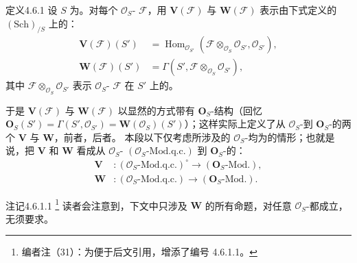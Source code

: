 \begin{SGAresult}{定义}{4.6.1}
设 $S$ 为。对每个 $\mathcal O_S$- $\mathcal F$，用 $\mathbf V(\mathcal F)$ 与 $\mathbf W(\mathcal F)$ 表示由下式定义的 $(\mathrm{Sch})_{/S}$ 上的：
\[
\begin{aligned}
\mathbf V(\mathcal F)(S')&=\operatorname{Hom}_{\mathcal O_{S'}}(\mathcal F\otimes_{\mathcal O_S}\mathcal O_{S'},\mathcal O_{S'}),\\
\mathbf W(\mathcal F)(S')&=\Gamma(S',\mathcal F\otimes_{\mathcal O_S}\mathcal O_{S'}),
\end{aligned}
\]
其中 $\mathcal F\otimes_{\mathcal O_S}\mathcal O_{S'}$ 表示 $\mathcal O_S$- $\mathcal F$ 在 $S'$ 上的。
\end{SGAresult}
于是 $\mathbf V(\mathcal F)$ 与 $\mathbf W(\mathcal F)$ 以显然的方式带有 $\mathbf O_S$-结构（回忆 $\mathbf O_S(S')=\Gamma(S',\mathcal O_{S'})=\mathbf W(\mathcal O_S)(S')$）；这样实际上定义了从 $\mathcal O_S$-到 $\mathbf O_S$-的两个 $\mathbf V$ 与 $\mathbf W$，前者，后者。
本段以下仅考虑所涉及的 $\mathcal O_S$-均为的情形；也就是说，把 $\mathbf V$ 和 $\mathbf W$ 看成从 $\mathcal O_S$- $(\mathcal O_S\text{-}\mathrm{Mod.q.c.})$ 到 $\mathbf O_S$-的：
\[
\begin{aligned}
\mathbf V &: (\mathcal O_S\text{-}\mathrm{Mod.q.c.})^\circ\longrightarrow(\mathbf O_S\text{-}\mathrm{Mod.}),\\
\mathbf W &: (\mathcal O_S\text{-}\mathrm{Mod.q.c.})\longrightarrow(\mathbf O_S\text{-}\mathrm{Mod.}).
\end{aligned}
\]
\begin{SGAresult}{注记}{4.6.1.1}
\footnote{编者注（31）：为便于后文引用，增添了编号 4.6.1.1。} 读者会注意到，下文中只涉及 $\mathbf W$ 的所有命题，对任意 $\mathcal O_S$-都成立，无须要求。
\end{SGAresult}
